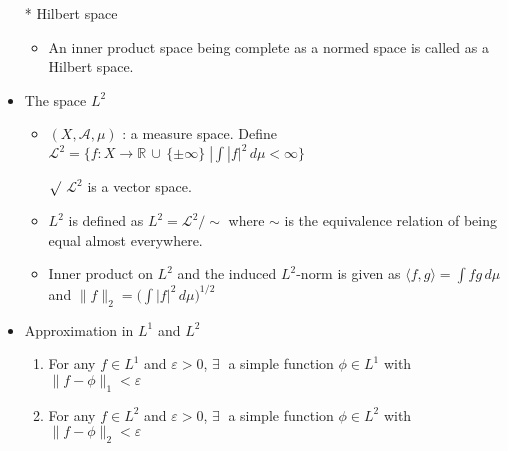 \documentclass[12pt]{article}
\newcommand{\rmk}{$\surd$}
\newcommand{\R}{\mathbb{R}}
\newcommand{\A}{\mathcal{A}}
\newcommand{\LL}{\mathcal{L}}
\newcommand{\exist}{\exists \;}
\newcommand{\union}{\,\cup\,}
\begin{document}
\begin{itemize}
\begin{itemize}
    \end{itemize}
    \item [*] Hilbert space
    \begin{itemize}
        \item An inner product space being complete as a normed space is called as a Hilbert space.
    \end{itemize}
    \item The space $L^2$
    \begin{itemize}
        \item $(X,\A, \mu)$ : a measure space. Define $\LL^2=\big\{f:X\rightarrow \R\union \{\pm \infty\}\;| \int |f|^2\, d\mu<\infty \big\}$
        \item[\rmk] $\LL^2$ is a vector space.
        \item $L^2$ is defined as $L^2=\LL^2/\sim$ where $\sim$ is the equivalence relation of being equal almost everywhere.
        \item Inner product on $L^2$ and the induced $L^2$-norm is given as  $\langle f,g \rangle = \int fg \, d\mu $ and $\|f\|_2 = \big( \int |f|^2 \, d\mu \big)^{1/2}$ 
    \end{itemize}
    \item Approximation in $L^1$ and $L^2$
    \begin{enumerate}
        \item For any $f\in L^1$ and $\varepsilon>0$, $\exist$ a simple function $\phi\in L^1$ with $\|f-\phi\|_1<\varepsilon$
        \item For any $f\in L^2$ and $\varepsilon>0$, $\exist$ a simple function $\phi\in L^2$ with $\|f-\phi\|_2<\varepsilon$
    \end{enumerate}
\end{itemize}
\end{document}

